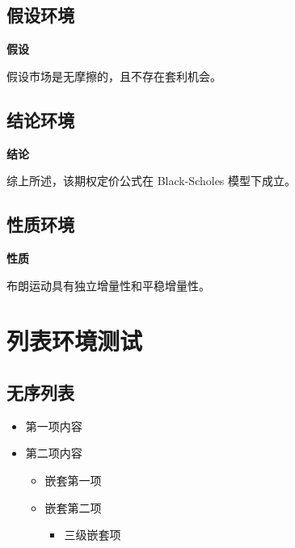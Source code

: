 \documentclass[
  11pt,
  letterpaper,
  oneside,
  a4paper]{book}
\providecommand{\tightlist}{%
  \setlength{\itemsep}{0pt}\setlength{\parskip}{0pt}}
\providecommand{\citshape}{\itshape}
\newenvironment{assumption}{\par\noindent\textbf{\color{third}假设} \citshape}{\par}
\newenvironment{conclusion}{\par\noindent\textbf{\color{third}结论} \citshape}{\par}
\newenvironment{property}{\par\noindent\textbf{\color{third}性质} \citshape}{\par}
\renewcommand{\citshape}{\kaishu}
\renewcommand{\citshape}{\itshape}
\numberwithin{equation}{chapter}
\theoremstyle{plain}
\theoremstyle{definition}
\theoremstyle{plain}
\theoremstyle{plain}
\theoremstyle{plain}
\theoremstyle{remark}
\begin{document}
\subsection{假设环境}\label{ux5047ux8bbeux73afux5883}

\begin{assumption}

假设市场是无摩擦的，且不存在套利机会。

\end{assumption}

\subsection{结论环境}\label{ux7ed3ux8bbaux73afux5883}

\begin{conclusion}

综上所述，该期权定价公式在 Black-Scholes 模型下成立。

\end{conclusion}

\subsection{性质环境}\label{ux6027ux8d28ux73afux5883}

\begin{property}

布朗运动具有独立增量性和平稳增量性。

\end{property}

\section{列表环境测试}\label{ux5217ux8868ux73afux5883ux6d4bux8bd5}

\subsection{无序列表}\label{ux65e0ux5e8fux5217ux8868}

\begin{itemize}
\tightlist
\item
  第一项内容
\item
  第二项内容

  \begin{itemize}
  \tightlist
  \item
    嵌套第一项
  \item
    嵌套第二项

    \begin{itemize}
    \tightlist
    \item
      三级嵌套项
    \end{itemize}
  \end{itemize}
\end{itemize}
\end{document}
